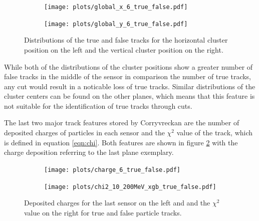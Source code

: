 \begin{figure}
  \hspace{-2.5cm}
  \begin{subfigure}{0.62\textwidth}
      \centering
      \texttt{[image: plots/global\_x\_6\_true\_false.pdf]}
  \end{subfigure}
  \begin{subfigure}{0.62\textwidth}
      \hspace{0.95cm}
      \texttt{[image: plots/global\_y\_6\_true\_false.pdf]}
  \end{subfigure}
  \caption{Distributions of the true and false tracks for the horizontal cluster position on the left and the vertical cluster position on the right.}
  \label{fig:clus_pos}
\end{figure}

While both of the distributions of the cluster positions show a greater number of false tracks in the middle of the sensor in comparison the number of true tracks,
any cut would result in a noticable loss of true tracks. Similar distributions of the cluster centers can be found on the other planes, which means that this feature
is not suitable for the identification of true tracks through cuts.

The last two major track features stored by Corryvreckan are the number of deposited charges of particles in each sensor and the $\chi^2$ value of the track,
which is defined in equation \ref{eqn:chi}.
Both features are shown in figure \ref{fig:charge_chi} with the charge deposition referring to the last plane exemplary.

\begin{figure}
  \hspace{-2.5cm}
  \begin{subfigure}{0.62\textwidth}
      \centering
      \texttt{[image: plots/charge\_6\_true\_false.pdf]}
  \end{subfigure}
  \begin{subfigure}{0.62\textwidth}
      \hspace{0.95cm}
      \texttt{[image: plots/chi2\_10\_200MeV\_xgb\_true\_false.pdf]}
  \end{subfigure}
  \caption{Deposited charges for the last sensor on the left and and the $\chi^2$ value on the right for true and false particle tracks.}
  \label{fig:charge_chi}
\end{figure}

